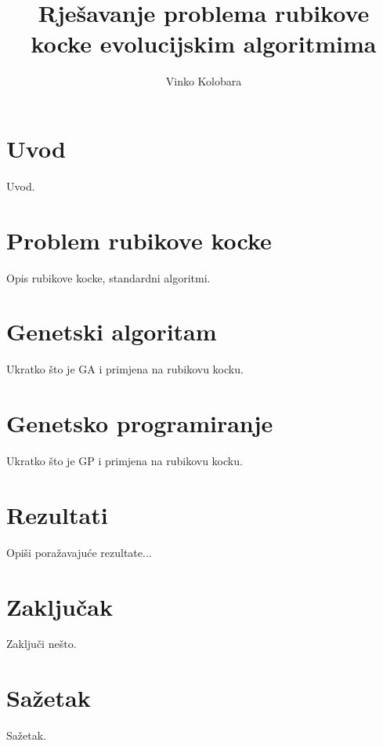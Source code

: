 \documentclass[times, utf8, seminar, numeric]{fer}
\begin{document}
\nocite{*}

\title{Rješavanje problema rubikove kocke evolucijskim algoritmima}

\author{Vinko Kolobara}


\maketitle

\tableofcontents

\chapter{Uvod}
Uvod.

\chapter{Problem rubikove kocke}
Opis rubikove kocke, standardni algoritmi.

\chapter{Genetski algoritam}
Ukratko što je GA i primjena na rubikovu kocku.

\chapter{Genetsko programiranje}
Ukratko što je GP i primjena na rubikovu kocku.

\chapter{Rezultati}
Opiši poražavajuće rezultate...

\chapter{Zaključak}
Zaključi nešto.




\chapter{Sažetak}
Sažetak.
\end{document}
